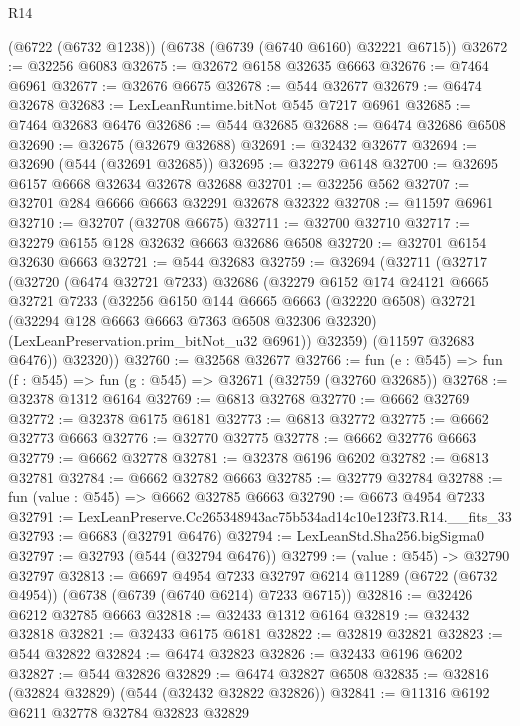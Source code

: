 \begin{lexlean}{R14}
\begin{coremodule}
    (@6722 (@6732 @1238))
    (@6738 (@6739 (@6740 @6160) @32221 @6715))
@32672 := @32256 @6083
@32675 := @32672 @6158 @32635 @6663
@32676 := @7464 @6961
@32677 := @32676 @6675
@32678 := @544 @32677
@32679 := @6474 @32678
@32683 := LexLeanRuntime.bitNot @545 @7217 @6961
@32685 := @7464 @32683 @6476
@32686 := @544 @32685
@32688 := @6474 @32686 @6508
@32690 := @32675 (@32679 @32688)
@32691 := @32432 @32677
@32694 := @32690 (@544 (@32691 @32685))
@32695 := @32279 @6148
@32700 := @32695 @6157 @6668 @32634 @32678 @32688
@32701 := @32256 @562
@32707 := @32701 @284 @6666 @6663 @32291 @32678 @32322
@32708 := @11597 @6961
@32710 := @32707 (@32708 @6675)
@32711 := @32700 @32710
@32717 := @32279 @6155 @128 @32632 @6663 @32686 @6508
@32720 := @32701 @6154 @32630 @6663
@32721 := @544 @32683
@32759 := @32694
    (@32711
      (@32717
        (@32720
          (@6474 @32721 @7233)
          @32686
          (@32279
            @6152
            @174
            @24121
            @6665
            @32721
            @7233
            (@32256
              @6150
              @144
              @6665
              @6663
              (@32220 @6508)
              @32721
              (@32294 @128 @6663 @6663 @7363 @6508 @32306 @32320)
              (LexLeanPreservation.prim_bitNot_u32 @6961))
            @32359)
          (@11597 @32683 @6476))
        @32320))
@32760 := @32568 @32677
@32766 := fun (e : @545) => fun (f : @545) => fun (g : @545) => @32671 (@32759 (@32760 @32685))
@32768 := @32378 @1312 @6164
@32769 := @6813 @32768
@32770 := @6662 @32769
@32772 := @32378 @6175 @6181
@32773 := @6813 @32772
@32775 := @6662 @32773 @6663
@32776 := @32770 @32775
@32778 := @6662 @32776 @6663
@32779 := @6662 @32778
@32781 := @32378 @6196 @6202
@32782 := @6813 @32781
@32784 := @6662 @32782 @6663
@32785 := @32779 @32784
@32788 := fun (value : @545) => @6662 @32785 @6663
@32790 := @6673 @4954 @7233
@32791 := LexLeanPreserve.Cc265348943ac75b534ad14c10e123f73.R14.__fits_33
@32793 := @6683 (@32791 @6476)
@32794 := LexLeanStd.Sha256.bigSigma0
@32797 := @32793 (@544 (@32794 @6476))
@32799 := (value : @545) -> @32790 @32797
@32813 := @6697
    @4954
    @7233
    @32797
    @6214
    @11289
    (@6722 (@6732 @4954))
    (@6738 (@6739 (@6740 @6214) @7233 @6715))
@32816 := @32426 @6212 @32785 @6663
@32818 := @32433 @1312 @6164
@32819 := @32432 @32818
@32821 := @32433 @6175 @6181
@32822 := @32819 @32821
@32823 := @544 @32822
@32824 := @6474 @32823
@32826 := @32433 @6196 @6202
@32827 := @544 @32826
@32829 := @6474 @32827 @6508
@32835 := @32816 (@32824 @32829) (@544 (@32432 @32822 @32826))
@32841 := @11316 @6192 @6211 @32778 @32784 @32823 @32829

\end{coremodule}
\end{lexlean}
